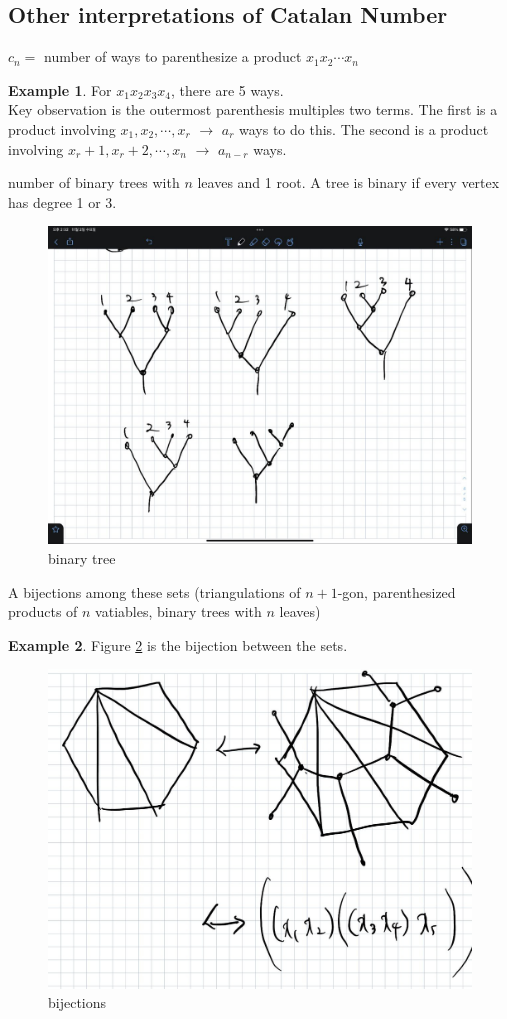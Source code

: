 \documentclass{article}
\theoremstyle{definition}
\newtheorem{ex}{Example}[]
\begin{document}
\subsection{Other interpretations of Catalan Number}
$c_n =$ number of ways to parenthesize a product $x_1 x_2 \cdots x_n$  
\begin{ex}
    For $x_1 x_2 x_3 x_4$, there are 5 ways. \\ 
    Key observation is the outermost parenthesis multiples two terms.
    The first is a product involving $x_1, x_2, \cdots , x_r$ $\rightarrow$ $a_r$ 
    ways to do this. The second is a product involving $x_r+1, x_r+2, \cdots, x_n$ $\rightarrow$
    $a_{n-r}$ ways.
\end{ex}
number of binary trees with $n$ leaves and 1 root. A tree is binary if 
every vertex has degree 1 or 3. \\ 
\begin{figure}[!h]
    \centerline{\includegraphics[width=0.5\columnwidth]{tree.jpg}}
    \caption{binary tree}
    \label{binary tree} 
\end{figure}
A bijections among these sets (triangulations of $n+1$-gon, parenthesized products
of $n$ vatiables, binary trees with $n$ leaves)
\begin{ex}
    Figure \ref{figure_1} is the bijection between the sets.
    \begin{figure}[!h]
        \centerline{\includegraphics[width=0.5\columnwidth]{bijection_gon.jpg}}
        \caption{bijections}
        \label{figure_1} 
    \end{figure}
\end{ex}
\end{document}
